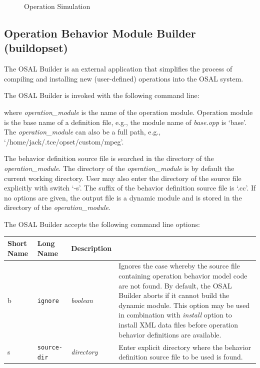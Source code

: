 \documentclass[twoside]{tceusermanual}
\begin{document}
\begin{figure}[tb]
\centerline{}
\caption{Operation Simulation}
\label{fig:osed_simulate_dialog}
\end{figure}

\subsection{Operation Behavior Module Builder (buildopset)}
\label{sec:buildopset}

The OSAL Builder is an external application that simplifies the process of
compiling and installing new (user-defined) operations into the OSAL system.

The OSAL Builder is invoked with the following command line:


where \emph{operation\_module} is the name of the operation module. 
Operation module is the base name of a definition file, e.g., the module
name of \emph{base.opp} is `base'. The \emph{operation\_module} can also be
a full path, e.g., `/home/jack/.tce/opset/custom/mpeg'.

The behavior definition source file is searched in the directory of the
\emph{operation\_module}. The directory of the \emph{operation\_module} is
by 
default the current working directory. User may also enter the directory of
the source file explicitly with switch `-s'. The suffix of the
behavior definition source file is `.cc'.
%
If no options are given, the output file is a dynamic module and is stored
in the directory of the \emph{operation\_module}.  

The OSAL Builder accepts the following command line options:

\begin{center}
\begin{longtable}[htb]{@{}p{}@{}p{}@{}p{}%
                     @{}p{}}

\textbf{Short Name} &\textbf{Long Name} &\textbf{Description} \\
\hline

b & \verb|ignore|         & \emph{boolean} &

Ignores the case whereby the source file containing operation behavior model
code are not found.  By default, the OSAL Builder aborts if it cannot build
the dynamic module.  This option may be used in combination with
\emph{install} option to install XML data files before operation behavior
definitions are available.\\

s & \verb|source-dir|         & \emph{directory} &

Enter explicit directory where the behavior definition source file to
be used is found.

\end{longtable}
\end{center}
\end{document}

